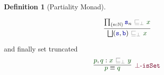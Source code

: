 \documentclass[twoside,11pt,openright]{report}
\theoremstyle{plain} %
\theoremstyle{definition}
\newtheorem{defn}{Definition}[section]
\theoremstyle{remark}
\newcommand*{\term}[1]{\textcolor{green!30!black}{#1}} %
\newcommand*{\relation}[1]{\textcolor{gray}{\ensuremath{\mathtt{#1}}}}
\newcommand*{\function}[1]{\textcolor{blue!60!black}{\ensuremath{\mathtt{#1}}}}
\newcommand*{\constructor}[1]{\textcolor{purple!60!black}{\ensuremath{\mathtt{#1}}}}
\begin{document}
\begin{defn}[Partiality Monad]
\begin{center}
\begin{minipage}{0.50\linewidth}
    \end{minipage}
    \hfill
    \begin{minipage}{0.3\linewidth}
      \begin{equation}
        \infer{\bigsqcup(\function{s},\function{b})~\relation{\sqsubseteq_{\bot}}~\term{x}}{\prod_{(n:\mathbb{N})} \function{s}_n~\relation{\sqsubseteq_{\bot}}~\term{x}}
      \end{equation}
    \end{minipage}
  \end{center}
  and finally set truncated
  \begin{equation}
    \infer[\constructor{\bot\text{-}isSet}]{\term{p} \equiv \term{q}}{\term{p} , \term{q} : \term{x}~\relation{\sqsubseteq_{\bot}}~\term{y}}
  \end{equation}
\end{defn}
\end{document}
